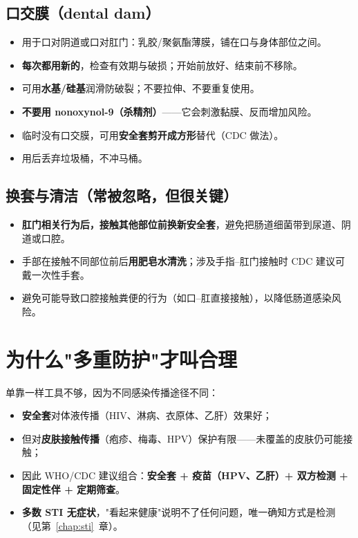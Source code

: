 \subsection*{口交膜（dental dam）}

\begin{itemize}[leftmargin=2em]
  \item 用于口对阴道或口对肛门：乳胶/聚氨酯薄膜，铺在口与身体部位之间。
  \item \textbf{每次都用新的}，检查有效期与破损；开始前放好、结束前不移除。
  \item 可用\textbf{水基/硅基}润滑防破裂；不要拉伸、不要重复使用。
  \item \textbf{不要用 nonoxynol-9（杀精剂）}——它会刺激黏膜、反而增加风险。
  \item 临时没有口交膜，可用\textbf{安全套剪开成方形}替代（CDC 做法）。
  \item 用后丢弃垃圾桶，不冲马桶。
\end{itemize}

\subsection*{换套与清洁（常被忽略，但很关键）}

\begin{itemize}[leftmargin=2em]
  \item \textbf{肛门相关行为后，接触其他部位前换新安全套}，避免把肠道细菌带到尿道、阴道或口腔。
  \item 手部在接触不同部位前后\textbf{用肥皂水清洗}；涉及手指--肛门接触时 CDC 建议可戴一次性手套。
  \item 避免可能导致口腔接触粪便的行为（如口--肛直接接触），以降低肠道感染风险。
\end{itemize}

\section{为什么"多重防护"才叫合理}

单靠一样工具不够，因为不同感染传播途径不同：

\begin{itemize}[leftmargin=2em]
  \item \textbf{安全套}对体液传播（HIV、淋病、衣原体、乙肝）效果好；
  \item 但对\textbf{皮肤接触传播}（疱疹、梅毒、HPV）保护有限——未覆盖的皮肤仍可能接触；
  \item 因此 WHO/CDC 建议组合：\textbf{安全套 + 疫苗（HPV、乙肝）+ 双方检测 + 固定性伴 + 定期筛查}。
  \item \textbf{多数 STI 无症状}，"看起来健康"说明不了任何问题，唯一确知方式是检测
        （见第~\ref{chap:sti}~章）。
\end{itemize}

